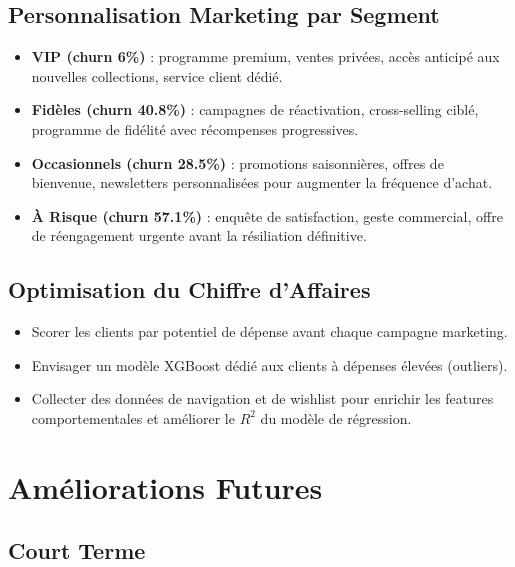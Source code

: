 \documentclass[12pt,a4paper]{article}
\begin{document}
\subsection{Personnalisation Marketing par Segment}

\begin{itemize}
  \item \textbf{VIP (churn 6\%)} : programme premium, ventes privées, accès anticipé
        aux nouvelles collections, service client dédié.
  \item \textbf{Fidèles (churn 40.8\%)} : campagnes de réactivation, cross-selling ciblé,
        programme de fidélité avec récompenses progressives.
  \item \textbf{Occasionnels (churn 28.5\%)} : promotions saisonnières, offres de bienvenue,
        newsletters personnalisées pour augmenter la fréquence d'achat.
  \item \textbf{À Risque (churn 57.1\%)} : enquête de satisfaction, geste commercial,
        offre de réengagement urgente avant la résiliation définitive.
\end{itemize}

\subsection{Optimisation du Chiffre d'Affaires}

\begin{itemize}
  \item Scorer les clients par potentiel de dépense avant chaque campagne marketing.
  \item Envisager un modèle XGBoost dédié aux clients à dépenses élevées (outliers).
  \item Collecter des données de navigation et de wishlist pour enrichir les features
        comportementales et améliorer le $R^2$ du modèle de régression.
\end{itemize}

\section{Améliorations Futures}

\subsection{Court Terme}
\end{document}
